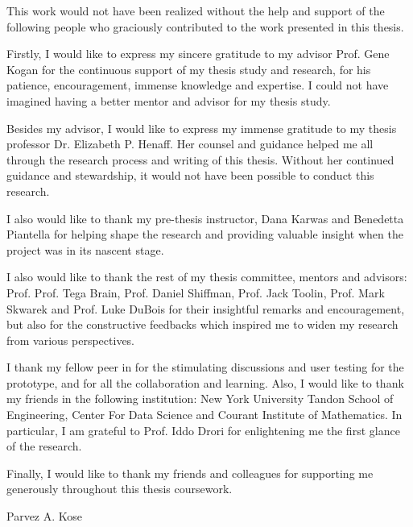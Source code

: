 %
%
%
%
%

\begin{acknowledgments} 

This work would not have been realized without the help and support of the following people who graciously contributed to the work presented in this thesis.

Firstly, I would like to express my sincere gratitude to my advisor Prof. Gene Kogan for the continuous support of my thesis study and research, for his patience, encouragement, immense knowledge and expertise. I could not have imagined having a better mentor and advisor for my thesis study.

Besides my advisor, I would like to express my immense gratitude to my thesis professor Dr. Elizabeth P. Henaff. Her counsel and guidance helped me all through the research process and writing of this thesis. Without her continued guidance and stewardship, it would not have been possible to conduct this research.

I also would like to thank my pre-thesis instructor, Dana Karwas and Benedetta Piantella for helping shape the research and providing valuable insight when the project was in its nascent stage. 

I also would like to thank the rest of my thesis committee, mentors and advisors: Prof. Prof. Tega Brain, Prof. Daniel Shiffman, Prof. Jack Toolin, Prof. Mark Skwarek and Prof. Luke DuBois for their insightful remarks and encouragement, but also for the constructive feedbacks which inspired me to widen my research from various perspectives.

I thank my fellow peer in for the stimulating discussions and user testing for the prototype, and for all the collaboration and learning. Also, I would like to thank my friends in the following institution: New York University Tandon School of Engineering, Center For Data Science and Courant Institute of Mathematics. In particular, I am grateful to Prof. Iddo Drori for enlightening me the first glance of the research.

Finally, I would like to thank my friends and colleagues for supporting me generously throughout this thesis coursework.

\begin{flushright} 
Parvez A. Kose
\end{flushright}
\end{acknowledgments}

